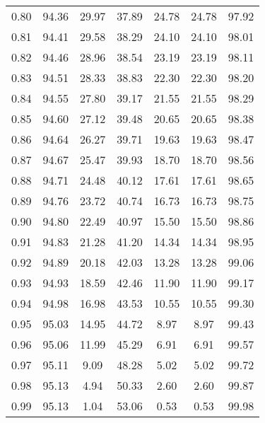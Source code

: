 \begin{tabular}{|c|c|c|c|c|c|c|}
      0.80 &     94.36 &     29.97 &      37.89 &   24.78 &      24.78 &         97.92 \\
      0.81 &     94.41 &     29.58 &      38.29 &   24.10 &      24.10 &         98.01 \\
      0.82 &     94.46 &     28.96 &      38.54 &   23.19 &      23.19 &         98.11 \\
      0.83 &     94.51 &     28.33 &      38.83 &   22.30 &      22.30 &         98.20 \\
      0.84 &     94.55 &     27.80 &      39.17 &   21.55 &      21.55 &         98.29 \\
      0.85 &     94.60 &     27.12 &      39.48 &   20.65 &      20.65 &         98.38 \\
      0.86 &     94.64 &     26.27 &      39.71 &   19.63 &      19.63 &         98.47 \\
      0.87 &     94.67 &     25.47 &      39.93 &   18.70 &      18.70 &         98.56 \\
      0.88 &     94.71 &     24.48 &      40.12 &   17.61 &      17.61 &         98.65 \\
      0.89 &     94.76 &     23.72 &      40.74 &   16.73 &      16.73 &         98.75 \\
      0.90 &     94.80 &     22.49 &      40.97 &   15.50 &      15.50 &         98.86 \\
      0.91 &     94.83 &     21.28 &      41.20 &   14.34 &      14.34 &         98.95 \\
      0.92 &     94.89 &     20.18 &      42.03 &   13.28 &      13.28 &         99.06 \\
      0.93 &     94.93 &     18.59 &      42.46 &   11.90 &      11.90 &         99.17 \\
      0.94 &     94.98 &     16.98 &      43.53 &   10.55 &      10.55 &         99.30 \\
      0.95 &     95.03 &     14.95 &      44.72 &    8.97 &       8.97 &         99.43 \\
      0.96 &     95.06 &     11.99 &      45.29 &    6.91 &       6.91 &         99.57 \\
      0.97 &     95.11 &      9.09 &      48.28 &    5.02 &       5.02 &         99.72 \\
      0.98 &     95.13 &      4.94 &      50.33 &    2.60 &       2.60 &         99.87 \\
      0.99 &     95.13 &      1.04 &      53.06 &    0.53 &       0.53 &         99.98 \\
\bottomrule
\end{tabular}
